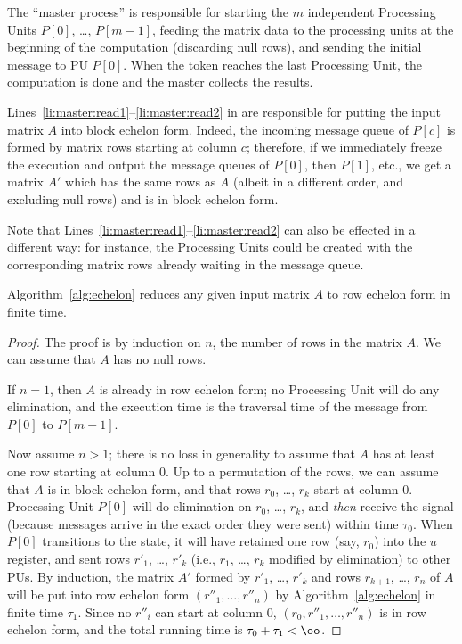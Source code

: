 The ``master process'' is responsible for starting the $m$ independent
Processing Units $P[0]$, \ldots, $P[m-1]$, feeding the matrix data to
the processing units at the beginning of the computation (discarding
null rows), and sending the initial  message to PU $P[0]$.
When the  token reaches the last Processing Unit, the
computation is done and the master collects the results.

Lines~\ref{li:master:read1}--\ref{li:master:read2} in 
are responsible for putting the input matrix $A$ into block
echelon form. Indeed, the incoming message queue of $P[c]$ is formed
by matrix rows starting at column $c$; therefore, if we immediately
freeze the execution and output the message queues of $P[0]$, then
$P[1]$, etc., we get a matrix $A'$ which has the same rows as $A$
(albeit in a different order, and excluding null rows) and is in block echelon form.

Note that Lines~\ref{li:master:read1}--\ref{li:master:read2} can also be
effected in a different way: for instance, the Processing Units could
be created with the corresponding matrix rows already waiting in the
message queue.  

\begin{theorem}
  Algorithm~\ref{alg:echelon} reduces any given input matrix $A$ to
  row echelon form in finite time.
\end{theorem}
\begin{proof}
  The proof is by induction on $n$, the number of rows in the matrix
  $A$.  We can assume that $A$ has no null rows.

  If $n=1$, then $A$ is already in row echelon form; no
  Processing Unit will do any elimination, and the execution time is
  the traversal time of the  message from $P[0]$ to
  $P[m-1]$.

  Now assume $n > 1$; there is no loss in generality to assume that
  $A$ has at least one row starting at column $0$.  Up to a
  permutation of the rows, we can assume that $A$ is in block
  echelon form, and that rows $r_0$, \ldots, $r_k$ start at column
  $0$. Processing Unit $P[0]$ will do elimination on $r_0$, \ldots,
  $r_k$, and \emph{then} receive the  signal (because
  messages arrive in the exact order they were sent) within time
  $\tau_0$.  When $P[0]$ transitions to the  state, it will
  have retained one row (say, $r_0$) into the $u$ register, and sent
  rows $r'_1$, \ldots, $r'_k$ (i.e., $r_1$, \ldots, $r_k$ modified by
  elimination) to other PUs. By induction, the matrix $A'$ formed by
  $r'_1$, \ldots, $r'_k$ and rows $r_{k+1}$, \ldots, $r_n$ of $A$ will
  be put into row echelon form $(r''_1, \ldots, r''_n)$ by
  Algorithm~\ref{alg:echelon} in finite time $\tau_1$.  Since no
  $r''_i$ can start at column 0, $(r_0, r''_1, \ldots, r''_n)$ is in
  row echelon form, and the total running time is $\tau_0 +
  \tau_1 < \oo$.
\end{proof}

